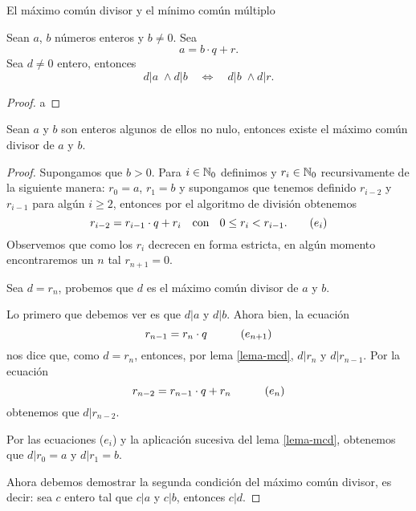 \begin{section}{El máximo común divisor y el mínimo común múltiplo}
\begin{lema}\label{lema-mcd}
    Sean $a$, $b$ números enteros y $b \ne 0$. Sea 
    \begin{equation*}
        a = b \cdot q + r.
    \end{equation*}
    Sea $d \ne 0$ entero,  entonces  
    \begin{equation*}
        d|a \;\wedge d |b \quad \Leftrightarrow \quad d|b \;\wedge d |r.
    \end{equation*}
\end{lema}
\begin{proof}
    a
\end{proof}


\begin{proposicion}\label{prop-mcd-existe}
    Sean $a$ y $b$ son enteros algunos de ellos no nulo, entonces existe el máximo común divisor de  $a$ y $b$. 
\end{proposicion}
\begin{proof} Supongamos que $b >0$. Para $i \in \mathbb N_0$ definimos y $r_i \in \mathbb N_0$ recursivamente  de la siguiente manera: $r_0 = a$, $r_1 = b$ y  supongamos que  tenemos definido $r_{i-2}$ y $r_{i-1}$ para algún $i \ge 2$,  entonces por el algoritmo de división obtenemos
    \begin{equation}
        r_{i-2} =   r_{i-1}\cdot q + r_{i} \quad \text{con \; $0 \le r_{i} < r_{i-1}$.} \tag{$e_i$}
    \end{equation}
    Observemos que como los $r_i$  decrecen en forma estricta, en algún momento encontraremos un $n$ tal $r_{n+1} =0$. 
    
    Sea $d = r_{n}$, probemos que $d$  es el máximo común divisor de $a$ y $b$.

    Lo primero que debemos ver es que $d|a$ y $d|b$. Ahora bien,  la ecuación 
    \begin{equation}
        r_{n-1} =   r_{n}\cdot q  \quad  \tag{$e_{n+1}$}
    \end{equation}
    nos dice que, como $d= r_n$, entonces, por lema \ref{lema-mcd}, $d|r_n$ y  $d|r_{n-1}$. Por la ecuación 
    \begin{equation}
        r_{n-2} =   r_{n-1}\cdot q + r_{n} \quad  \tag{$e_{n}$}
    \end{equation}
    obtenemos que  $d|r_{n-2}$. 

    Por las ecuaciones ($e_i$) y  la aplicación sucesiva del lema \ref{lema-mcd}, obtenemos que $d|r_0 = a$ y $d| r_1 =b$. 

    Ahora debemos demostrar la segunda condición del  máximo común divisor, es decir: sea $c$ entero tal que $c|a$ y $c|b$, entonces $c|d$. 
    

\end{proof}
\end{section}
